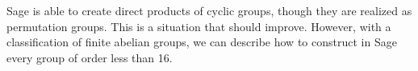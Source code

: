 Sage is able to create direct products of cyclic groups, though they are realized as permutation groups.  This is a situation that should improve.  However, with a classification of finite abelian groups, we can describe how to construct in Sage every group of order less than 16.